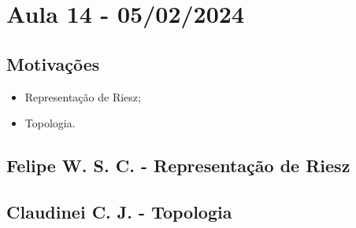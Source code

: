 \documentclass[measure_theory.tex]{subfiles}
\begin{document}
\section{Aula 14 - 05/02/2024}
\subsection{Motivações}
\begin{itemize}
	\item Representação de Riesz;
	\item Topologia.
\end{itemize}
\subsection{Felipe W. S. C. - Representação de Riesz}
\subsection{Claudinei C. J. - Topologia}
\end{document}
